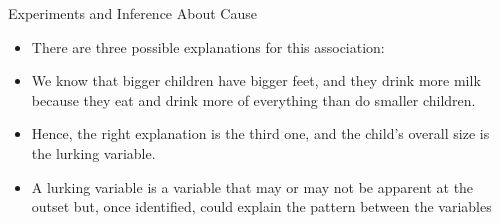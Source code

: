 \documentclass[handout]{beamer}
\begin{document}
\begin{frame}{Experiments and Inference About Cause}
\scriptsize{

\begin{itemize}
\item There are three possible explanations for this association:
\item We know that bigger children have bigger feet, and they drink more milk because they eat and drink more of everything than do smaller children.

\item Hence, the right explanation is the third one, and the child’s overall size is the lurking variable.

 \item A lurking variable is a variable that may or may not be apparent at the outset but, once identified, could explain the pattern between the variables

\end{itemize}



} 
\end{frame}
\end{document}
